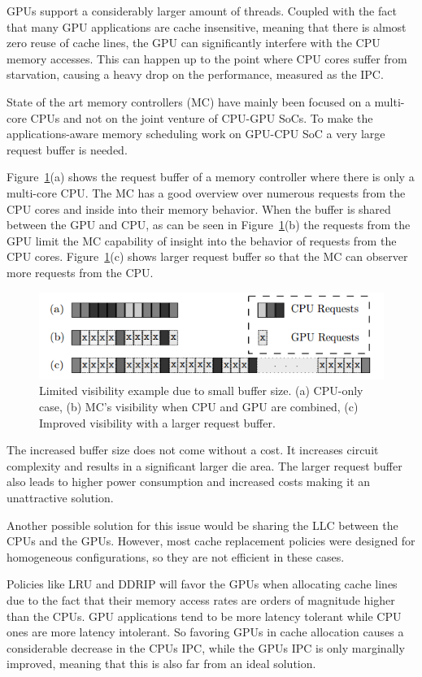 \documentclass[12pt,journal,compsoc]{IEEEtran}
\begin{document}
GPUs support a considerably larger amount of threads. Coupled with the fact that many GPU applications are cache insensitive, meaning that there is almost zero reuse of cache lines, the GPU can significantly interfere with the CPU memory accesses. This can happen up to the point where CPU cores suffer from starvation, causing a heavy drop on the performance, measured as the IPC.

State of the art memory controllers (MC) have mainly been focused on a multi-core CPUs and not on the joint venture of CPU-GPU SoCs.  To make the applications-aware memory scheduling work on GPU-CPU SoC a very large request buffer is needed.
 
Figure~\ref{fig:buff}(a) shows the request buffer of a memory controller where there is only a multi-core CPU.  The MC has a good overview over numerous requests from the CPU cores and inside into their memory behavior.  When the buffer is shared between the GPU and CPU, as can be seen in Figure~\ref{fig:buff}(b) the requests from the GPU limit the MC capability of insight into the behavior of requests from the CPU cores.  Figure~\ref{fig:buff}(c) shows larger request buffer so that the MC can observer more requests from the CPU\cite{SmS}.

\begin{figure}[H]
	\centering
	\includegraphics[width = 8 cm]{graphics/no1.png}
	\caption{Limited visibility example due to small buffer size. (a) CPU-only
		case, (b) MC’s visibility when CPU and GPU are combined, (c) Improved
		visibility with a larger request buffer.\cite{SmS}}\label{fig:buff}
\end{figure} 

The increased buffer size does not come without a cost. It increases circuit complexity and results in a significant larger die area. The larger request buffer also leads to higher power consumption and increased costs \cite{SmS} making it an unattractive solution. 

Another possible solution for this issue would be sharing the LLC between the CPUs and the GPUs. However, most cache replacement policies were designed for homogeneous configurations, so they are not efficient in these cases.

Policies like LRU and DDRIP will favor the GPUs when allocating cache lines due to the fact that their memory access rates are orders of magnitude higher than the CPUs. GPU applications tend to be more latency tolerant while CPU ones are more latency intolerant. So favoring GPUs in cache allocation causes a considerable decrease in the CPUs IPC, while the GPUs IPC is only marginally improved, meaning that this is also far from an ideal solution.
\end{document}

